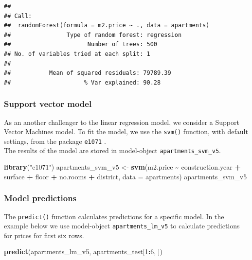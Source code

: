 \documentclass[12pt,]{krantz}
\newenvironment{Shaded}{\begin{snugshade}}{\end{snugshade}}
\newcommand{\DataTypeTok}[1]{\textcolor[rgb]{0.13,0.29,0.53}{#1}}
\newcommand{\DecValTok}[1]{\textcolor[rgb]{0.00,0.00,0.81}{#1}}
\newcommand{\KeywordTok}[1]{\textcolor[rgb]{0.13,0.29,0.53}{\textbf{#1}}}
\newcommand{\NormalTok}[1]{#1}
\newcommand{\OperatorTok}[1]{\textcolor[rgb]{0.81,0.36,0.00}{\textbf{#1}}}
\newcommand{\StringTok}[1]{\textcolor[rgb]{0.31,0.60,0.02}{#1}}
\begin{document}
\begin{verbatim}
## 
## Call:
##  randomForest(formula = m2.price ~ ., data = apartments) 
##                Type of random forest: regression
##                      Number of trees: 500
## No. of variables tried at each split: 1
## 
##           Mean of squared residuals: 79789.39
##                     % Var explained: 90.28
\end{verbatim}

\hypertarget{model-Apartments-svm}{%
\subsubsection{Support vector model}\label{model-Apartments-svm}}

As an another challenger to the linear regression model, we consider a Support Vector Machines model. To fit the model, we use the \texttt{svm()} function, with default settings, from the package \texttt{e1071} \citep{R-e1071}.\\
The results of the model are stored in model-object \texttt{apartments\_svm\_v5}.

\begin{Shaded}
\begin{Highlighting}[]
\KeywordTok{library}\NormalTok{(}\StringTok{"e1071"}\NormalTok{)}
\NormalTok{apartments\_svm\_v5 \textless{}{-}}\StringTok{ }\KeywordTok{svm}\NormalTok{(m2.price }\OperatorTok{\textasciitilde{}}\StringTok{ }\NormalTok{construction.year }\OperatorTok{+}\StringTok{ }\NormalTok{surface }\OperatorTok{+}\StringTok{ }\NormalTok{floor }\OperatorTok{+}\StringTok{ }
\StringTok{                         }\NormalTok{no.rooms }\OperatorTok{+}\StringTok{ }\NormalTok{district, }\DataTypeTok{data =}\NormalTok{ apartments)}
\NormalTok{apartments\_svm\_v5}
\end{Highlighting}
\end{Shaded}

\hypertarget{predictionsApartments}{%
\subsubsection{Model predictions}\label{predictionsApartments}}

The \texttt{predict()} function calculates predictions for a specific model. In the example below we use model-object \texttt{apartments\_lm\_v5} to calculate predictions for prices for first six rows.

\begin{Shaded}
\begin{Highlighting}[]
\KeywordTok{predict}\NormalTok{(apartments\_lm\_v5, apartments\_test[}\DecValTok{1}\OperatorTok{:}\DecValTok{6}\NormalTok{, ])}
\end{Highlighting}
\end{Shaded}
\end{document}
